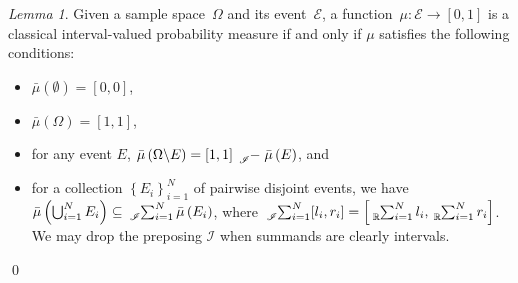 \documentclass{article}
\theoremstyle{remark}
\newtheorem{lemma}{Lemma}
\newcommand{\events}{\ensuremath{\mathcal{E}}}
\newcommand{\necess}{{\mbox{\wesa{certain}}}}
\newcommand{\yutsung}[1]{\fbox{\begin{minipage}{0.9\textwidth}\color{purple}{Yu-Tsung says: #1}\end{minipage}}}
\begin{document}
\begin{lemma}\label{lem:classicalProbabilityMeasure}Given a sample
space~$\Omega$ and its event~$\events$, a function~$\mu:\events\rightarrow[0,1]$
is a classical interval-valued probability measure if and only if
$\mu$ satisfies the following conditions: 
\begin{itemize}
\item $\bar{\mu}(\emptyset)=[0,0]$, 
\item $\bar{\mu}(\Omega)=[1,1]$, 
\item for any event $E$, $\bar{\mu}\left(\Omega\backslash E\right)=\left[1,1\right]\tensor*[_{\mathscr{I}}]{-}{}\bar{\mu}\left(E\right)$,
and 
\item for a collection $\left\{ E_{i}\right\} _{i=1}^{N}$ of pairwise disjoint
events, we have $\bar{\mu}\left(\bigcup_{i=1}^{N}E_{i}\right)\subseteq\tensor*[_{\mathscr{I}}]{\sum}{_{i=1}^{N}}\bar{\mu}\left(E_{i}\right)$,
where $\tensor*[_{\mathscr{I}}]{\sum}{_{i=1}^{N}}[l_{i},r_{i}]=\left[\tensor*[_{\mathbb{R}}]{\sum}{_{i=1}^{N}}l_{i},\tensor*[_{\mathbb{R}}]{\sum}{_{i=1}^{N}}r_{i}\right]$.
We may drop the preposing $\mathscr{I}$ when summands are clearly
intervals. 
\end{itemize}
\qed\end{lemma}


\end{document}
